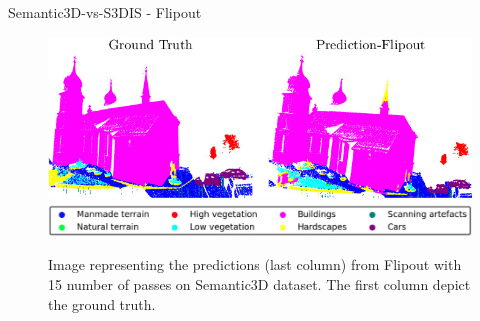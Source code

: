 \documentclass[aspectratio=169]{beamer}
\begin{document}
\begin{frame}{Semantic3D-vs-S3DIS - Flipout}
    \begin{figure}
        \centering
        \includegraphics[scale=0.5]{images/sem3d/Sem3d_Fout_op.jpg}
        \includegraphics[scale=0.25]{images/legend.jpg}
        \caption{Image representing the predictions (last column) from Flipout with 15 number of passes on Semantic3D dataset. The first column depict the ground truth.}
        \label{fig:sem3d_fout_op}
    \end{figure}
\end{frame}
\end{document}
